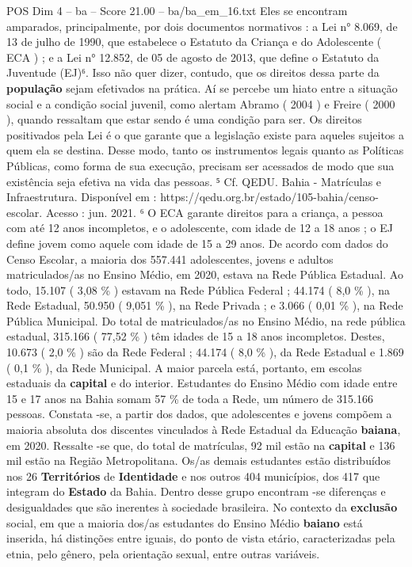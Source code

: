 \begin{textsample}{POS Dim 4 – ba – Score 21.00 – ba/ba\_em\_16.txt}
Eles se encontram amparados, principalmente, por dois documentos normativos : a Lei n{\EmojiFont °} 8.069, de 13 de julho de 1990, que estabelece o Estatuto da Criança e do Adolescente ( ECA ) ; e a Lei n{\EmojiFont °} 12.852, de 05 de agosto de 2013, que define o Estatuto da Juventude (EJ)⁶.
Isso não quer dizer, contudo, que os direitos dessa parte da \textbf{população} sejam efetivados na prática.
Aí se percebe um hiato entre a situação social e a condição social juvenil, como alertam Abramo ( 2004 ) e Freire ( 2000 ), quando ressaltam que estar sendo é uma condição para ser.
Os direitos positivados pela Lei é o que garante que a legislação existe para aqueles sujeitos a quem ela se destina.
Desse modo, tanto os instrumentos legais quanto as Políticas Públicas, como forma de sua execução, precisam ser acessados de modo que sua existência seja efetiva na vida das pessoas. ⁵ Cf.
QEDU.
Bahia - Matrículas e Infraestrutura.
Disponível em : https://qedu.org.br/estado/105-bahia/censo-escolar.
Acesso : jun. 2021. ⁶ O ECA garante direitos para a criança, a pessoa com até 12 anos incompletos, e o adolescente, com idade de 12 a 18 anos ; o EJ define jovem como aquele com idade de 15 a 29 anos.
De acordo com dados do Censo Escolar, a maioria dos 557.441 adolescentes, jovens e adultos matriculados/as no Ensino Médio, em 2020, estava na Rede Pública Estadual.
Ao todo, 15.107 ( 3,08 \% ) estavam na Rede Pública Federal ; 44.174 ( 8,0 \% ), na Rede Estadual, 50.950 ( 9,051 \% ), na Rede Privada ; e 3.066 ( 0,01 \% ), na Rede Pública Municipal.
Do total de matriculados/as no Ensino Médio, na rede pública estadual, 315.166 ( 77,52 \% ) têm idades de 15 a 18 anos incompletos.
Destes, 10.673 ( 2,0 \% ) são da Rede Federal ; 44.174 ( 8,0 \% ), da Rede Estadual e 1.869 ( 0,1 \% ), da Rede Municipal.
A maior parcela está, portanto, em escolas estaduais da \textbf{capital} e do interior.
Estudantes do Ensino Médio com idade entre 15 e 17 anos na Bahia somam 57 \% de toda a Rede, um número de 315.166 pessoas.
Constata -se, a partir dos dados, que adolescentes e jovens compõem a maioria absoluta dos discentes vinculados à Rede Estadual da Educação \textbf{baiana}, em 2020.
Ressalte -se que, do total de matrículas, 92 mil estão na \textbf{capital} e 136 mil estão na Região Metropolitana.
Os/as demais estudantes estão distribuídos nos 26 \textbf{Territórios} de \textbf{Identidade} e nos outros 404 municípios, dos 417 que integram do \textbf{Estado} da Bahia.
Dentro desse grupo encontram -se diferenças e desigualdades que são inerentes à sociedade brasileira.
No contexto da \textbf{exclusão} social, em que a maioria dos/as estudantes do Ensino Médio \textbf{baiano} está inserida, há distinções entre iguais, do ponto de vista etário, caracterizadas pela etnia, pelo gênero, pela orientação sexual, entre outras variáveis.

\end{textsample}
